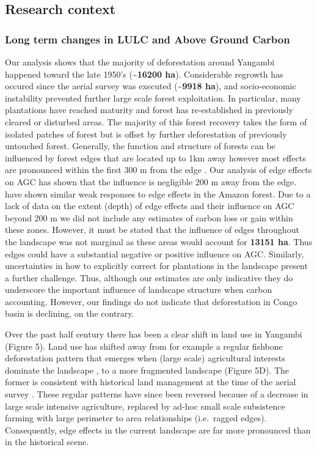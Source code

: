 \documentclass[remote sensing,article,submit,moreauthors,pdftex]{mdpi}
\begin{document}
\hypertarget{research-context}{%
\subsection{Research context}\label{research-context}}

\hypertarget{long-term-changes-in-lulc-and-above-ground-carbon-1}{%
\subsubsection{Long term changes in LULC and Above Ground
Carbon}\label{long-term-changes-in-lulc-and-above-ground-carbon-1}}

Our analysis shows that the majority of deforestation around Yangambi
happened toward the late 1950's (\textbf{\textasciitilde{}16200 ha}).
Considerable regrowth has occured since the aerial survey was executed
(\textbf{\textasciitilde{}9918 ha}), and socio-economic instability
prevented further large scale forest exploitation. In particular, many
plantations have reached maturity and forest has re-established in
previously cleared or disturbed areas. The majority of this forest
recovery takes the form of isolated patches of forest but is offset by
further deforestation of previously untouched forest. Generally, the
function and structure of forests can be influenced by forest edges that
are located up to 1km away however most effects are pronounced within
the first 300 m from the edge \citep{gascon2000}. Our analysis of edge
effects on AGC has shown that the influence is negligible 200 m away
from the edge. \citet{phillips2006} have shown similar weak responses to
edge effects in the Amazon forest. Due to a lack of data on the extent
(depth) of edge effects and their influence on AGC beyond 200 m we did
not include any estimates of carbon loss or gain within these zones.
However, it must be stated that the influence of edges throughout the
landscape was not marginal as these areas would account for
\textbf{13151 ha}. Thus edges could have a substantial negative
\citep{brinck2017} or positive \citep{reinmann2017} influence on AGC.
Similarly, uncertainties in how to explicitly correct for plantations in
the landscape present a further challenge. Thus, although our estimates
are only indicative they do underscore the important influence of
landscape structure when carbon accounting. However, our findings do not
indicate that deforestation in Congo basin is declining, on the
contrary.

Over the past half century there has been a clear shift in land use in
Yangambi (Figure 5). Land use has shifted away from for example a
regular fishbone deforestation pattern that emerges when (large scale)
agricultural interests dominate the landscape \citep{arima2015}, to a
more fragmented landscape (Figure 5D). The former is consistent with
historical land management at the time of the aerial survey
\citep{bustillo2018}. These regular patterns have since been reversed
because of a decrease in large scale intensive agriculture, replaced by
ad-hoc small scale subsistence farming with large perimeter to area
relationships (i.e.~ragged edges). Consequently, edge effects in the
current landscape are far more pronounced than in the historical scene.
\end{document}
